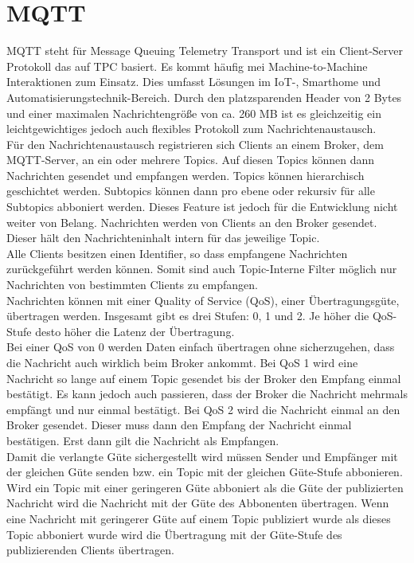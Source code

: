 \documentclass[11pt,a4paper]{report}
\begin{document}
\section{MQTT}
MQTT steht für Message Queuing Telemetry Transport und ist ein Client-Server Protokoll das auf TPC basiert.
Es kommt häufig mei Machine-to-Machine Interaktionen zum Einsatz.
Dies umfasst Lösungen im IoT-, Smarthome und Automatisierungstechnik-Bereich.
Durch den platzsparenden Header von 2 Bytes und einer maximalen Nachrichtengröße von ca. 260 MB ist es gleichzeitig ein leichtgewichtiges jedoch auch flexibles Protokoll zum Nachrichtenaustausch.
\\
Für den Nachrichtenaustausch registrieren sich Clients an einem Broker, dem MQTT-Server, an ein oder mehrere Topics.
Auf diesen Topics können dann Nachrichten gesendet und empfangen werden.
Topics können hierarchisch geschichtet werden.
Subtopics können dann pro ebene oder rekursiv für alle Subtopics abboniert werden.
Dieses Feature ist jedoch für die Entwicklung nicht weiter von Belang.
Nachrichten werden von Clients an den Broker gesendet.
Dieser hält den Nachrichteninhalt intern für das jeweilige Topic.
\\
Alle Clients besitzen einen Identifier, so dass empfangene Nachrichten zurückgeführt werden können.
Somit sind auch Topic-Interne Filter möglich nur Nachrichten von bestimmten Clients zu empfangen.
\\
Nachrichten können mit einer Quality of Service (QoS), einer Übertragungsgüte, übertragen werden.
Insgesamt gibt es drei Stufen: 0, 1 und 2.
Je höher die QoS-Stufe desto höher die Latenz der Übertragung.
\\
Bei einer QoS von 0 werden Daten einfach übertragen ohne sicherzugehen, dass die Nachricht auch wirklich beim Broker ankommt. 
Bei QoS 1 wird eine Nachricht so lange auf einem Topic gesendet bis der Broker den Empfang einmal bestätigt.
Es kann jedoch auch passieren, dass der Broker die Nachricht mehrmals empfängt und nur einmal bestätigt.
Bei QoS 2 wird die Nachricht einmal an den Broker gesendet.
Dieser muss dann den Empfang der Nachricht einmal bestätigen.
Erst dann gilt die Nachricht als Empfangen.
\\
Damit die verlangte Güte sichergestellt wird müssen Sender und Empfänger mit der gleichen Güte senden bzw. ein Topic mit der gleichen Güte-Stufe abbonieren.
Wird ein Topic mit einer geringeren Güte abboniert als die Güte der publizierten Nachricht wird die Nachricht mit der Güte des Abbonenten übertragen.
Wenn eine Nachricht mit geringerer Güte auf einem Topic publiziert wurde als dieses Topic abboniert wurde wird die Übertragung mit der Güte-Stufe des publizierenden Clients übertragen.
\end{document}
